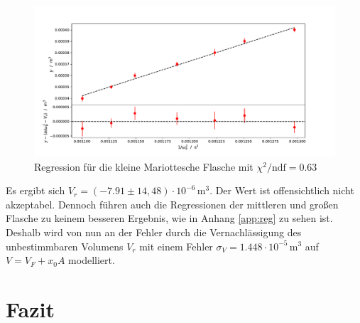 \documentclass[a4paper, 12pt]{scrartcl}
\begin{document}
\begin{figure}[H]
\centering
\includegraphics[width=\textwidth]{plots/regression_kleine.pdf}
\caption{Regression für die kleine Mariottesche Flasche mit $\chi^2/\text{ndf} = 0.63$}
\label{plt:reg_kle}
\end{figure}
Es ergibt sich $V_r = (-7.91 \pm 14,48) \cdot 10^{-6}\,\text{m}^3$. Der Wert ist offensichtlich nicht akzeptabel. Dennoch führen auch die Regressionen der mittleren und großen Flasche zu keinem besseren Ergebnis, wie in Anhang \ref{app:reg} zu sehen ist. Deshalb wird von nun an der Fehler durch die Vernachlässigung des unbestimmbaren Volumens $V_r$ mit einem Fehler $\sigma_V = 1.448 \cdot 10^{-5}\,\text{m}^3$ auf $V = V_{F} + x_0A$ modelliert.


\section{Fazit}

\appendix
\end{document}
